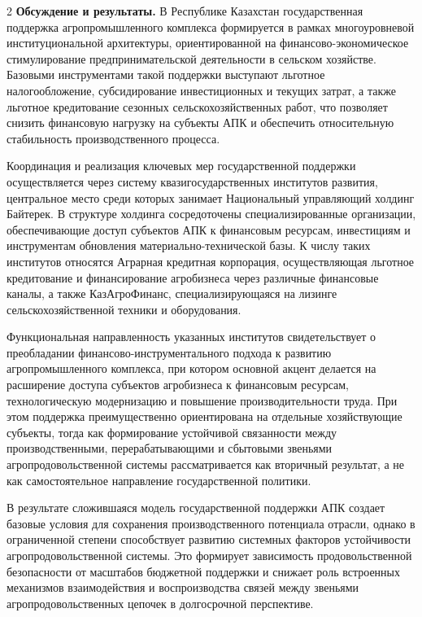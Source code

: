 \begin{multicols}{2}
{\bfseries Обсуждение и результаты.} В Республике Казахстан государственная
поддержка агропромышленного комплекса формируется в рамках
многоуровневой институциональной архитектуры, ориентированной на
финансово-экономическое стимулирование предпринимательской деятельности
в сельском хозяйстве. Базовыми инструментами такой поддержки выступают
льготное налогообложение, субсидирование инвестиционных и текущих
затрат, а также льготное кредитование сезонных сельскохозяйственных
работ, что позволяет снизить финансовую нагрузку на субъекты АПК и
обеспечить относительную стабильность производственного процесса.

Координация и реализация ключевых мер государственной поддержки
осуществляется через систему квазигосударственных институтов развития,
центральное место среди которых занимает Национальный управляющий
холдинг Байтерек. В структуре холдинга сосредоточены специализированные
организации, обеспечивающие доступ субъектов АПК к финансовым ресурсам,
инвестициям и инструментам обновления материально-технической базы. К
числу таких институтов относятся Аграрная кредитная корпорация,
осуществляющая льготное кредитование и финансирование агробизнеса через
различные финансовые каналы, а также КазАгроФинанс, специализирующаяся
на лизинге сельскохозяйственной техники и оборудования.

Функциональная направленность указанных институтов свидетельствует о
преобладании финансово-инструментального подхода к развитию
агропромышленного комплекса, при котором основной акцент делается на
расширение доступа субъектов агробизнеса к финансовым ресурсам,
технологическую модернизацию и повышение производительности труда. При
этом поддержка преимущественно ориентирована на отдельные хозяйствующие
субъекты, тогда как формирование устойчивой связанности между
производственными, перерабатывающими и сбытовыми звеньями
агропродовольственной системы рассматривается как вторичный результат, а
не как самостоятельное направление государственной политики.

В результате сложившаяся модель государственной поддержки АПК создает
базовые условия для сохранения производственного потенциала отрасли,
однако в ограниченной степени способствует развитию системных факторов
устойчивости агропродовольственной системы. Это формирует зависимость
продовольственной безопасности от масштабов бюджетной поддержки и
снижает роль встроенных механизмов взаимодействия и воспроизводства
связей между звеньями агропродовольственных цепочек в долгосрочной
перспективе.
\end{multicols}

